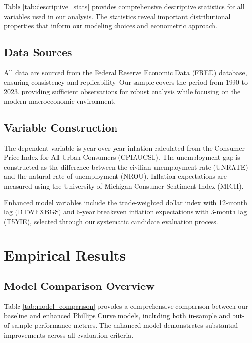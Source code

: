 \documentclass[12pt]{article}
\begin{document}
Table \ref{tab:descriptive_stats} provides comprehensive descriptive statistics for all variables used in our analysis. The statistics reveal important distributional properties that inform our modeling choices and econometric approach.



\subsection{Data Sources}

All data are sourced from the Federal Reserve Economic Data (FRED) database, ensuring consistency and replicability. Our sample covers the period from 1990 to 2023, providing sufficient observations for robust analysis while focusing on the modern macroeconomic environment.

\subsection{Variable Construction}

The dependent variable is year-over-year inflation calculated from the Consumer Price Index for All Urban Consumers (CPIAUCSL). The unemployment gap is constructed as the difference between the civilian unemployment rate (UNRATE) and the natural rate of unemployment (NROU). Inflation expectations are measured using the University of Michigan Consumer Sentiment Index (MICH).

Enhanced model variables include the trade-weighted dollar index with 12-month lag (DTWEXBGS) and 5-year breakeven inflation expectations with 3-month lag (T5YIE), selected through our systematic candidate evaluation process.

\section{Empirical Results}

\subsection{Model Comparison Overview}

Table \ref{tab:model_comparison} provides a comprehensive comparison between our baseline and enhanced Phillips Curve models, including both in-sample and out-of-sample performance metrics. The enhanced model demonstrates substantial improvements across all evaluation criteria.
\end{document}
